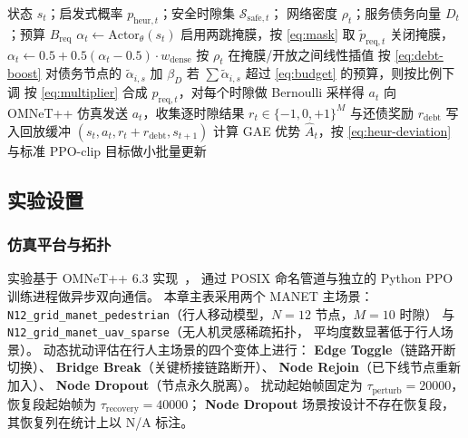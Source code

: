 \begin{algorithm}[H]
\caption{DASD-PPO 一帧训练流程}
\label{alg:dasd-ppo}
\begin{algorithmic}[1]
\Require 状态 $s_t$；启发式概率 $p_{\mathrm{heur},t}$；安全时隙集 $\mathcal{S}_{\mathrm{safe},t}$；
         网络密度 $\rho_t$；服务债务向量 $D_t$；预算 $B_{\mathrm{req}}$
\State $\alpha_t \gets \mathrm{Actor}_\theta(s_t)$
    \State 启用两跳掩膜，按 \eqref{eq:mask} 取 $\tilde{p}_{\mathrm{req},t}$
    \State 关闭掩膜，$\alpha_t \gets 0.5 + 0.5(\alpha_t - 0.5) \cdot w_{\mathrm{dense}}$
\Else
    \State 按 $\rho_t$ 在掩膜/开放之间线性插值
\EndIf
\State 按 \eqref{eq:debt-boost} 对债务节点的 $\tilde{\alpha}_{i,s}$ 加 $\beta_D$
\State 若 $\sum \tilde{\alpha}_{i,s}$ 超过 \eqref{eq:budget} 的预算，则按比例下调
\State 按 \eqref{eq:multiplier} 合成 $p_{\mathrm{req},t}$，对每个时隙做 Bernoulli 采样得 $a_t$
\State 向 OMNeT++ 仿真发送 $a_t$，收集逐时隙结果 $r_t \in \{-1,0,+1\}^M$ 与还债奖励 $r_{\mathrm{debt}}$
\State 写入回放缓冲 $(s_t, a_t, r_t + r_{\mathrm{debt}}, s_{t+1})$
    \State 计算 GAE 优势 $\hat{A}_t$，按 \eqref{eq:heur-deviation} 与标准 PPO-clip 目标做小批量更新
\EndIf
\end{algorithmic}
\end{algorithm}

\subsection{实验设置}
\label{subsec:setup}

\subsubsection{仿真平台与拓扑}

实验基于 OMNeT++ 6.3 实现~\cite{omnetpp}，
通过 POSIX 命名管道与独立的 Python PPO 训练进程做异步双向通信。
本章主表采用两个 MANET 主场景：
\texttt{N12\_grid\_manet\_pedestrian}（行人移动模型，$N=12$ 节点，$M=10$ 时隙）
与 \texttt{N12\_grid\_manet\_uav\_sparse}（无人机灵感稀疏拓扑，
平均度数显著低于行人场景）。
动态扰动评估在行人主场景的四个变体上进行：
\textbf{Edge Toggle}（链路开断切换）、
\textbf{Bridge Break}（关键桥接链路断开）、
\textbf{Node Rejoin}（已下线节点重新加入）、
\textbf{Node Dropout}（节点永久脱离）。
扰动起始帧固定为 $\tau_{\mathrm{perturb}}=20000$，
恢复段起始帧为 $\tau_{\mathrm{recovery}}=40000$；
\textbf{Node Dropout} 场景按设计不存在恢复段，
其恢复列在统计上以 N/A 标注。


